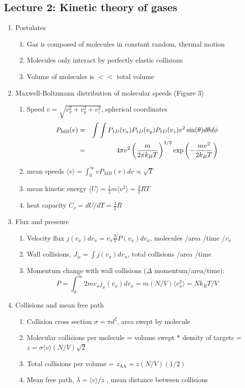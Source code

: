 \documentclass[11pt]{article}
\begin{document}
\subsection{Lecture 2: Kinetic theory of gases}
\label{sec:org92fa074}
\begin{enumerate}
\item Postulates
\begin{enumerate}
\item Gas is composed of molecules in constant random, thermal motion
\item Molecules only interact by perfectly elastic collisions
\item Volume of molecules is \(<<\) total volume
\end{enumerate}
\item Maxwell-Boltzmann distribution of molecular speeds (Figure 3)
\begin{enumerate}
\item Speed \(v=\sqrt{v_x^2+v_y^2+v_z^2}\), spherical coordinates
 \begin{eqnarray*}   
   P_{\rm MB}(v) & = &\int\int P_{1D}(v_x) P_{1D}(v_y) P_{1D}(v_z) v^2 \sin(\theta) d\theta d\phi \\
     & = &4\pi v^2 \left( \frac{m}{2\pi k_B T}\right)^{3/2}\exp\left(-\frac{m
v^2}{2k_B T}\right)
 \end{eqnarray*}
\item mean speeds \(\langle v \rangle = \int_0^{\infty} v P_{MB}(v)dv \propto \sqrt{T}\)
\item mean kinetic energy \(\langle U \rangle = \frac{1}{2} m \langle v^2 \rangle =\frac{3}{2} RT\)
\item heat capacity \(C_v= dU/dT = \frac{3}{2} R\)
\end{enumerate}
\item Flux and pressure
\begin{enumerate}
\item Velocity flux \(j(v_x) dv_x= v_x \frac{N}{V}P(v_x)dv_x\), molecules /area /time /\(v_x\)
\item Wall collisions, \(J_w = \int j(v_x) dv_x\), total collisions /area /time
\item Momentum change with wall collisions (\(\Delta\) momentum/area/time):
\[ P = \int_0^\infty 2 m v_x j_x(v_x) dv_x = m (N/V) \langle v_x^2 \rangle = N k_B T/V \]
\end{enumerate}
\item Collisions and mean free path
\begin{enumerate}
\item Collision cross section \(\sigma=\pi d^2\), area swept by molecule
\item Molecular collisions per molecule = volume swept * density of targets = \(z = \sigma \langle v \rangle (N/V) \sqrt{2}\)
\item Total collisions per volume = \(z_{\mathrm{AA}} = z  (N/V) (1/2)\)
\item Mean free path, \(\lambda = \langle v \rangle/z\) , mean distance between collisions
\end{enumerate}
\end{enumerate}
\end{document}
